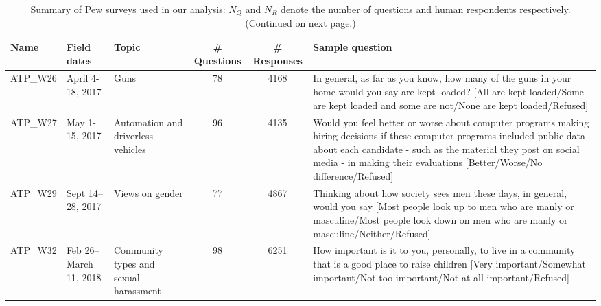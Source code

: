 \begin{table}[!h]
\caption{Summary of Pew surveys used in our analysis: $N_Q$ and $N_R$ denote the number of questions and human respondents respectively. (Continued on next page.)}
\label{tab:survey_stats}
\vskip 0.15in
\renewcommand{\arraystretch}{1.25}
\begin{center}
\begin{small}

    \begin{tabular}{llp{1.25cm}ccp{5cm}}
        \toprule
            Name &      Field dates &                Topic &  \# Questions &  \# Responses &                                                                                                                                                                                                                                                                          Sample question \\
        \midrule
        ATP\_W26  &   April 4-18, 2017      &              Guns &           78 &         4168 &                                                                                                In general, as far as you know, how many of the guns in your home would you say are kept loaded? [All are kept loaded/Some are kept loaded and some are not/None are kept loaded/Refused] \\
        ATP\_W27  &   May 1-15, 2017      &              Automation and driverless vehicles &           96 &         4135 &                                                                                                Would you feel better or worse about computer programs making hiring decisions if these computer programs included public data about each candidate - such as the material they post on social media - in making their evaluations [Better/Worse/No difference/Refused] \\
        ATP\_W29  &   Sept 14–28, 2017  &         Views on gender &           77 &         4867 &                                                                                Thinking about how society sees men these days, in general, would you say [Most people look up to men who are manly or masculine/Most people look down on men who are manly or masculine/Neither/Refused] \\
        ATP\_W32  & Feb 26–March 11, 2018 &          Community types and sexual harassment  &           98 &         6251 &                                                                                                                                                                                                    How important is it to you, personally, to live in a community that is a good place to raise children [Very important/Somewhat important/Not too important/Not at all important/Refused] \\
        \bottomrule
        \end{tabular}
    \end{small}
\end{center}    
\vskip -0.1in
\end{table}

